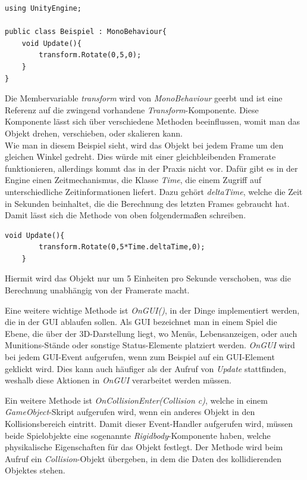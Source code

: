\begin{lstlisting}[caption={[Einfache Skript-Klasse mit Update-Methode]Einfache Skript-Klasse mit Update-Methode}]
using UnityEngine;

public class Beispiel : MonoBehaviour{
	void Update(){
		transform.Rotate(0,5,0);
	}
}
\end{lstlisting}

Die Membervariable \textit{transform} wird von \textit{MonoBehaviour} geerbt und ist eine Referenz auf die zwingend vorhandene \textit{Transform}-Komponente. Diese Komponente lässt sich über verschiedene Methoden beeinflussen, womit man das Objekt drehen, verschieben, oder skalieren kann.\\
Wie man in diesem Beispiel sieht, wird das Objekt bei jedem Frame um den gleichen Winkel gedreht. Dies würde mit einer gleichbleibenden Framerate funktionieren, allerdings kommt das in der Praxis nicht vor. Dafür gibt es in der Engine einen Zeitmechanismus, die Klasse \textit{Time}, die einem Zugriff auf unterschiedliche Zeitinformationen liefert. Dazu gehört \textit{deltaTime}, welche die Zeit in Sekunden beinhaltet, die die Berechnung des letzten Frames gebraucht hat. Damit lässt sich die Methode von oben folgendermaßen schreiben.
\pagebreak

\begin{lstlisting}[caption={[Einfache Update-Methode mit deltaTime]Einfache Update-Methode mit deltaTime}]
	void Update(){
		transform.Rotate(0,5*Time.deltaTime,0);
	}
\end{lstlisting}

Hiermit wird das Objekt nur um 5 Einheiten pro Sekunde verschoben, was die Berechnung unabhängig von der Framerate macht.

Eine weitere wichtige Methode ist \textit{OnGUI()}, in der Dinge implementiert werden, die in der GUI ablaufen sollen. Als GUI bezeichnet man in einem Spiel die Ebene, die über der 3D-Darstellung liegt, wo Menüs, Lebensanzeigen, oder auch Munitions-Stände oder sonstige Status-Elemente platziert werden. \textit{OnGUI} wird bei jedem GUI-Event aufgerufen, wenn zum Beispiel auf ein GUI-Element geklickt wird. Dies kann auch häufiger als der Aufruf von \textit{Update} stattfinden, weshalb diese Aktionen in \textit{OnGUI} verarbeitet werden müssen.

Ein weitere Methode ist \textit{OnCollisionEnter(Collision c)}, welche in einem \textit{GameObject}-Skript aufgerufen wird, wenn ein anderes Objekt in den Kollisionsbereich eintritt. Damit dieser Event-Handler aufgerufen wird, müssen beide Spielobjekte eine sogenannte \textit{Rigidbody}-Komponente haben, welche physikalische Eigenschaften für das Objekt festlegt. Der Methode wird beim Aufruf ein \textit{Collision}-Objekt übergeben, in dem die Daten des kollidierenden Objektes stehen.
\pagebreak

